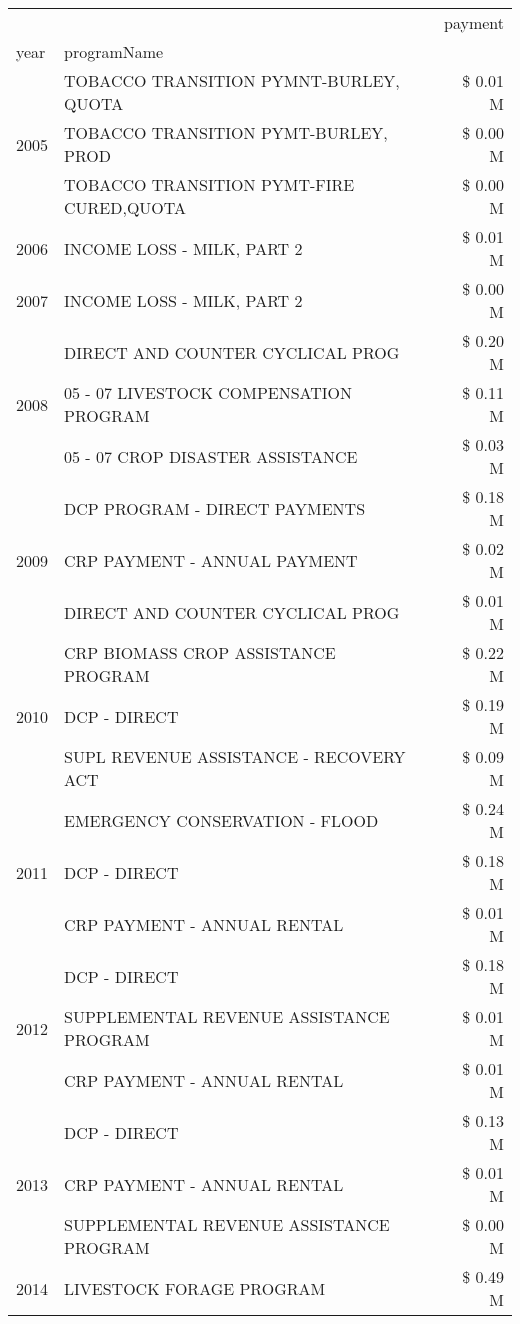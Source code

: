 \begin{tabular}{llr}
\toprule
 &  & payment \\
year & programName &  \\
\midrule
\multirow[t]{3}{*}{2005} & TOBACCO TRANSITION PYMNT-BURLEY, QUOTA & \$ 0.01 M \\
 & TOBACCO TRANSITION PYMT-BURLEY, PROD & \$ 0.00 M \\
 & TOBACCO TRANSITION PYMT-FIRE CURED,QUOTA & \$ 0.00 M \\
\cline{1-3}
2006 & INCOME LOSS - MILK, PART 2 & \$ 0.01 M \\
\cline{1-3}
2007 & INCOME LOSS - MILK, PART 2 & \$ 0.00 M \\
\cline{1-3}
\multirow[t]{3}{*}{2008} & DIRECT AND COUNTER CYCLICAL PROG & \$ 0.20 M \\
 & 05 - 07 LIVESTOCK COMPENSATION PROGRAM & \$ 0.11 M \\
 & 05 - 07 CROP DISASTER ASSISTANCE & \$ 0.03 M \\
\cline{1-3}
\multirow[t]{3}{*}{2009} & DCP PROGRAM - DIRECT PAYMENTS & \$ 0.18 M \\
 & CRP PAYMENT - ANNUAL PAYMENT & \$ 0.02 M \\
 & DIRECT AND COUNTER CYCLICAL PROG & \$ 0.01 M \\
\cline{1-3}
\multirow[t]{3}{*}{2010} & CRP BIOMASS CROP ASSISTANCE PROGRAM & \$ 0.22 M \\
 & DCP - DIRECT & \$ 0.19 M \\
 & SUPL REVENUE ASSISTANCE - RECOVERY ACT & \$ 0.09 M \\
\cline{1-3}
\multirow[t]{3}{*}{2011} & EMERGENCY CONSERVATION - FLOOD & \$ 0.24 M \\
 & DCP - DIRECT & \$ 0.18 M \\
 & CRP PAYMENT - ANNUAL RENTAL & \$ 0.01 M \\
\cline{1-3}
\multirow[t]{3}{*}{2012} & DCP - DIRECT & \$ 0.18 M \\
 & SUPPLEMENTAL REVENUE ASSISTANCE PROGRAM & \$ 0.01 M \\
 & CRP PAYMENT - ANNUAL RENTAL & \$ 0.01 M \\
\cline{1-3}
\multirow[t]{3}{*}{2013} & DCP - DIRECT & \$ 0.13 M \\
 & CRP PAYMENT - ANNUAL RENTAL & \$ 0.01 M \\
 & SUPPLEMENTAL REVENUE ASSISTANCE PROGRAM & \$ 0.00 M \\
\cline{1-3}
\multirow[t]{3}{*}{2014} & LIVESTOCK FORAGE PROGRAM & \$ 0.49 M \\

\end{tabular}
